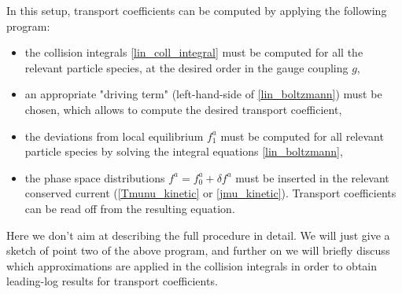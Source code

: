 In this setup, transport coefficients can be computed by applying the following program:
\begin{itemize}
\item the collision integrals \ref{lin_coll_integral} must be computed for all the relevant particle species, at the desired order in the gauge coupling $g$,
\item an appropriate "driving term" (left-hand-side of \ref{lin_boltzmann}) must be chosen, which allows to compute the desired transport coefficient,
\item the deviations from local equilibrium $f_1^a$ must be computed for all relevant particle species by solving the integral equations \ref{lin_boltzmann},
\item the phase space distributions $f^a = f^a_0 + \delta f^a$ must be inserted in the relevant conserved current (\ref{Tmunu_kinetic} or \ref{jmu_kinetic}). Transport coefficients can be read off from the resulting equation.
\end{itemize}
%
Here we don't aim at describing the full procedure in detail. We will just give a sketch of point two of the above program, and further on we will briefly discuss which approximations are applied in the collision integrals in order to obtain leading-log results for transport coefficients.

